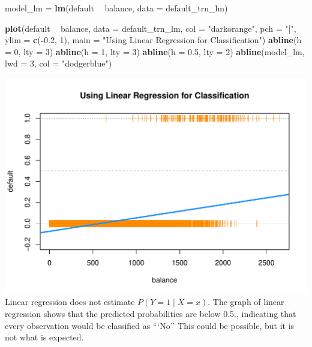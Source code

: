 \documentclass[]{report}
\newenvironment{Shaded}{\begin{snugshade}}{\end{snugshade}}
\newcommand{\KeywordTok}[1]{\textcolor[rgb]{0.13,0.29,0.53}{\textbf{#1}}}
\newcommand{\DataTypeTok}[1]{\textcolor[rgb]{0.13,0.29,0.53}{#1}}
\newcommand{\DecValTok}[1]{\textcolor[rgb]{0.00,0.00,0.81}{#1}}
\newcommand{\FloatTok}[1]{\textcolor[rgb]{0.00,0.00,0.81}{#1}}
\newcommand{\StringTok}[1]{\textcolor[rgb]{0.31,0.60,0.02}{#1}}
\newcommand{\OperatorTok}[1]{\textcolor[rgb]{0.81,0.36,0.00}{\textbf{#1}}}
\newcommand{\NormalTok}[1]{#1}
\begin{document}
\begin{Shaded}
\begin{Highlighting}[]
\NormalTok{model_lm =}\StringTok{ }\KeywordTok{lm}\NormalTok{(default }\OperatorTok{~}\StringTok{ }\NormalTok{balance, }\DataTypeTok{data =}\NormalTok{ default_trn_lm)}
\end{Highlighting}
\end{Shaded}

\begin{Shaded}
\begin{Highlighting}[]
\KeywordTok{plot}\NormalTok{(default }\OperatorTok{~}\StringTok{ }\NormalTok{balance, }\DataTypeTok{data =}\NormalTok{ default_trn_lm, }
     \DataTypeTok{col =} \StringTok{"darkorange"}\NormalTok{, }\DataTypeTok{pch =} \StringTok{"|"}\NormalTok{, }\DataTypeTok{ylim =} \KeywordTok{c}\NormalTok{(}\OperatorTok{-}\FloatTok{0.2}\NormalTok{, }\DecValTok{1}\NormalTok{),}
     \DataTypeTok{main =} \StringTok{"Using Linear Regression for Classification"}\NormalTok{)}
\KeywordTok{abline}\NormalTok{(}\DataTypeTok{h =} \DecValTok{0}\NormalTok{, }\DataTypeTok{lty =} \DecValTok{3}\NormalTok{)}
\KeywordTok{abline}\NormalTok{(}\DataTypeTok{h =} \DecValTok{1}\NormalTok{, }\DataTypeTok{lty =} \DecValTok{3}\NormalTok{)}
\KeywordTok{abline}\NormalTok{(}\DataTypeTok{h =} \FloatTok{0.5}\NormalTok{, }\DataTypeTok{lty =} \DecValTok{2}\NormalTok{)}
\KeywordTok{abline}\NormalTok{(model_lm, }\DataTypeTok{lwd =} \DecValTok{3}\NormalTok{, }\DataTypeTok{col =} \StringTok{"dodgerblue"}\NormalTok{)}
\end{Highlighting}
\end{Shaded}

\includegraphics{MyBook_files/figure-latex/unnamed-chunk-123-1.pdf}
Linear regression does not estimate \(P(Y = 1 \mid X = x)\). The graph
of linear regression shows that the predicted probabilities are below
0.5., indicating that every observation would be classified as ```No''
This could be possible, but it is not what is expected.
\end{document}
